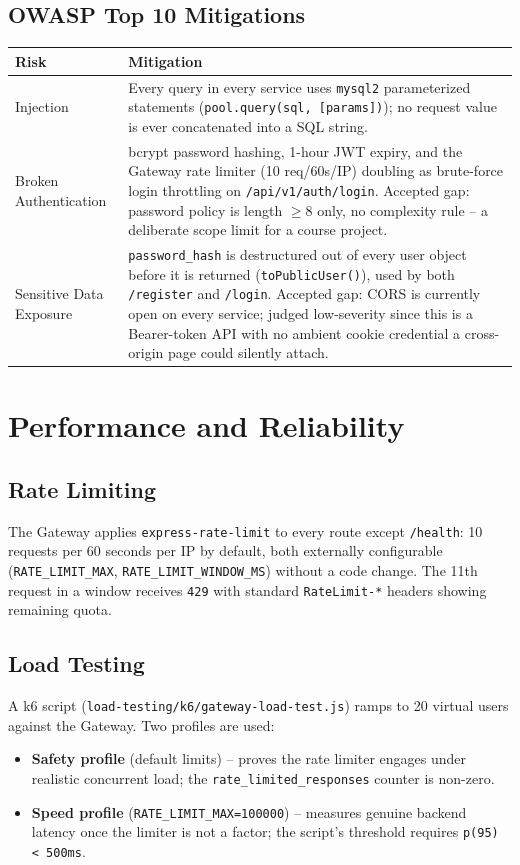 \documentclass[11pt,a4paper]{report}
\begin{document}
\section{OWASP Top 10 Mitigations}
\begin{longtable}{L{3.4cm} L{10.6cm}}
\toprule
\textbf{Risk} & \textbf{Mitigation} \\
\midrule
\endhead
Injection & Every query in every service uses \texttt{mysql2} parameterized statements (\texttt{pool.query(sql, [params])}); no request value is ever concatenated into a SQL string. \\
Broken Authentication & bcrypt password hashing, 1-hour JWT expiry, and the Gateway rate limiter (10 req/60s/IP) doubling as brute-force login throttling on \texttt{/api/v1/auth/login}. Accepted gap: password policy is length $\geq 8$ only, no complexity rule -- a deliberate scope limit for a course project. \\
Sensitive Data Exposure & \texttt{password\_hash} is destructured out of every user object before it is returned (\texttt{toPublicUser()}), used by both \texttt{/register} and \texttt{/login}. Accepted gap: CORS is currently open on every service; judged low-severity since this is a Bearer-token API with no ambient cookie credential a cross-origin page could silently attach. \\
\bottomrule
\end{longtable}

\chapter{Performance and Reliability}

\section{Rate Limiting}
The Gateway applies \texttt{express-rate-limit} to every route except
\texttt{/health}: 10 requests per 60 seconds per IP by default, both
externally configurable (\texttt{RATE\_LIMIT\_MAX},
\texttt{RATE\_LIMIT\_WINDOW\_MS}) without a code change. The 11th request in
a window receives \texttt{429} with standard \texttt{RateLimit-*} headers
showing remaining quota.

\section{Load Testing}
A k6 script (\texttt{load-testing/k6/gateway-load-test.js}) ramps to 20
virtual users against the Gateway. Two profiles are used:
\begin{itemize}[leftmargin=1.4em]
  \item \textbf{Safety profile} (default limits) -- proves the rate limiter engages under realistic concurrent load; the \texttt{rate\_limited\_responses} counter is non-zero.
  \item \textbf{Speed profile} (\texttt{RATE\_LIMIT\_MAX=100000}) -- measures genuine backend latency once the limiter is not a factor; the script's threshold requires \texttt{p(95) < 500ms}.
\end{itemize}
\end{document}
